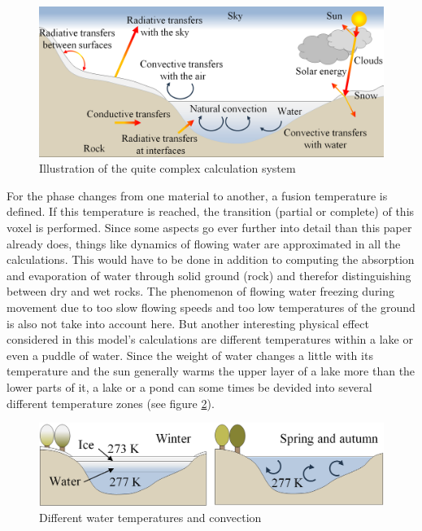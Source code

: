 \begin{figure}[htb]
	\centering
	\includegraphics[width=\linewidth]{BF01/8904_1.png}
	\caption{Illustration of the quite complex calculation system}
	\label{fig:calcsystem}
\end{figure}

For the phase changes from one material to another, a fusion temperature is defined. If this temperature is reached, the transition (partial or complete) of this voxel is performed. Since some aspects go ever further into detail than this paper already does, things like dynamics of flowing water are approximated in all the calculations. This would have to be done in addition to computing the absorption and evaporation of water through solid ground (rock) and therefor distinguishing between dry and wet rocks. The phenomenon of flowing water freezing during movement due to too slow flowing speeds and too low temperatures of the ground is also not take into account here. But another interesting physical effect considered in this model's calculations are different temperatures within a lake or even a puddle of water. Since the weight of water changes a little with its temperature and the sun generally warms the upper layer of a lake more than the lower parts of it, a lake or a pond can some times be devided into several different temperature zones (see figure \ref{fig:waterconvection}).

\begin{figure}[htb]
	\centering
	\includegraphics[width=\linewidth]{BF01/h_1.png}
	\caption{Different water temperatures and convection}
	\label{fig:waterconvection}
\end{figure}

